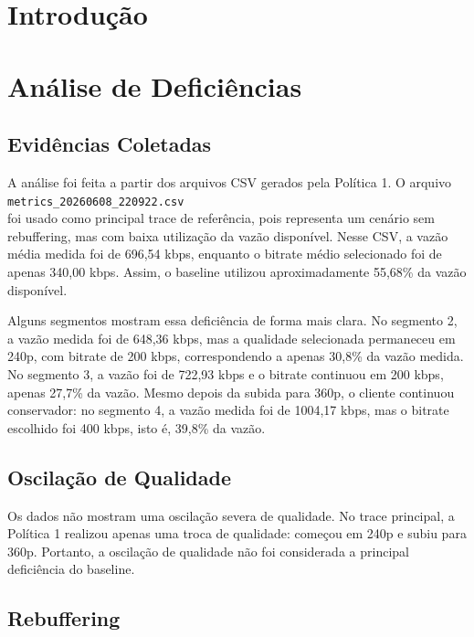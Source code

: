 \documentclass[
    12pt,
    a4paper,
    oneside
]{article}
\begin{document}
\section{Introdução}



\section{Análise de Deficiências}
\label{sec:analise}

\subsection{Evidências Coletadas}

A análise foi feita a partir dos arquivos CSV gerados pela Política 1. O arquivo \\ \texttt{metrics\_20260608\_220922.csv}\\
foi usado como principal trace de referência, pois representa um cenário sem rebuffering, mas com baixa utilização da vazão disponível. Nesse CSV, a vazão média medida foi de 696,54 kbps, enquanto o bitrate médio selecionado foi de apenas 340,00 kbps. Assim, o baseline utilizou aproximadamente 55,68\% da vazão disponível.

Alguns segmentos mostram essa deficiência de forma mais clara. No segmento 2, a vazão medida foi de 648,36 kbps, mas a qualidade selecionada permaneceu em 240p, com bitrate de 200 kbps, correspondendo a apenas 30,8\% da vazão medida. No segmento 3, a vazão foi de 722,93 kbps e o bitrate continuou em 200 kbps, apenas 27,7\% da vazão. Mesmo depois da subida para 360p, o cliente continuou conservador: no segmento 4, a vazão medida foi de 1004,17 kbps, mas o bitrate escolhido foi 400 kbps, isto é, 39,8\% da vazão.

\subsection{Oscilação de Qualidade}

Os dados não mostram uma oscilação severa de qualidade. No trace principal, a Política 1 realizou apenas uma troca de qualidade: começou em 240p e subiu para 360p. Portanto, a oscilação de qualidade não foi considerada a principal deficiência do baseline.

\subsection{Rebuffering}
\end{document}
